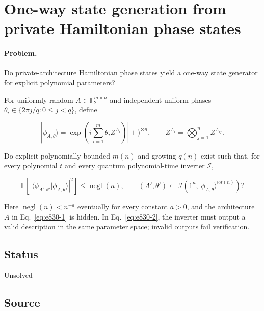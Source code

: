 \section{One-way state generation from private Hamiltonian phase states}
\label{sec:op_e8307b66d76af92a}

\paragraph{Problem.}
Do private-architecture Hamiltonian phase states yield a one-way state generator for explicit polynomial parameters?

For uniformly random $A\in\mathbb F_2^{m\times n}$ and independent uniform phases $\theta_i\in\{2\pi j/q:0\leq j<q\}$, define

\begin{equation}
|\phi_{A,\theta}\rangle
=\exp\!\left(i\sum_{i=1}^m\theta_iZ^{A_i}\right)|+\rangle^{\otimes n},
\qquad
Z^{A_i}=\bigotimes_{j=1}^n Z^{A_{ij}}.
\label{eq:e830-1}
\end{equation}

Do explicit polynomially bounded $m(n)$ and growing $q(n)$ exist such that, for every polynomial $t$ and every quantum polynomial-time inverter $\mathcal I$,

\begin{equation}
\mathbb E\!\left[
\left|\langle\phi_{A',\theta'}|\phi_{A,\theta}\rangle\right|^2
\right]\leq\operatorname{negl}(n),
\qquad
(A',\theta')\leftarrow\mathcal I(1^n,|\phi_{A,\theta}\rangle^{\otimes t(n)})?
\label{eq:e830-2}
\end{equation}

Here $\operatorname{negl}(n)<n^{-a}$ eventually for every constant $a>0$, and the architecture $A$ in Eq.~\eqref{eq:e830-1} is hidden. In Eq.~\eqref{eq:e830-2}, the inverter must output a valid description in the same parameter space; invalid outputs fail verification.

\subsection*{Status}

Unsolved

\subsection*{Source}

